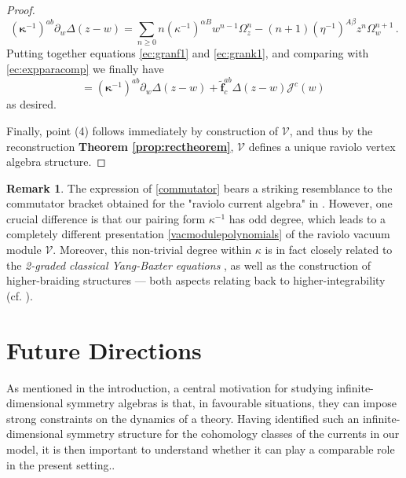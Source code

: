 \documentclass[11pt]{amsart}
\numberwithin{equation}{section}
\numberwithin{figure}{section}
\numberwithin{table}{section}
\theoremstyle{thm}
\numberwithin{equation}{subsection}
\theoremstyle{definition}
\theoremstyle{rem}
\newtheorem{remark}{Remark}
\begin{document}
\begin{proof}
\begin{equation}
\label{ec:grank1}
    (\bm{\kappa}^{-1})^{ab}\partial_w\Delta(z-w)=\sum_{n\geq 0} n(\kappa^{-1})^{\alpha B}w^{n-1}\Omega_z^n - (n+1)(\eta^{-1})^{A\beta}z^n\Omega_w^{n+1}\,.
\end{equation}
Putting together equations \eqref{ec:granf1} and \eqref{ec:grank1}, and comparing with \eqref{ec:expparacomp} we finally have 
\begin{equation}
    [\mathcal{J}^a(z),\mathcal{J}^b(w)]= (\bm{\kappa}^{-1})^{ab}\partial_w\Delta(z-w) + \mathbf{\tilde f}^{ab}_c\Delta(z-w)\mathcal{J}^c(w)\,
    \label{commutator}
\end{equation}
as desired.


\medskip

Finally, point (4) follows immediately by construction of $\mathcal{V}$, and thus by the reconstruction \textbf{Theorem \ref{prop:rectheorem}}, $\mathcal{V}$ defines a unique raviolo vertex algebra structure.


\end{proof}

\begin{remark}
    The expression of \eqref{commutator} bears a striking resemblance to the commutator bracket obtained for the "raviolo current algebra" in \cite{Garner:2023zqn}. However, one crucial difference is that our pairing form $\kappa^{-1}$ has odd degree, which leads to a completely different presentation \eqref{vacmodulepolynomials} of the raviolo vacuum module $\mathcal{V}$. Moreover, this non-trivial degree within $\kappa$ is in fact closely related to the \textit{2-graded classical Yang-Baxter equations} \cite{Bai_2013,chen:2022,Cirio:2012be}, as well as the construction of higher-braiding structures \cite{Chen:2023tjf,Kemp_2025} --- both aspects relating back to higher-integrability (cf. \cite{Chen:2023integrable}).
\end{remark}


\medskip




\section*{Future Directions}


As mentioned in the introduction, a central motivation for studying infinite-dimensional symmetry algebras is that, in favourable situations, they can impose strong constraints on the dynamics of a theory. Having identified such an infinite-dimensional symmetry structure for the cohomology classes of the currents in our model, it is then important to understand whether it can play a comparable role in the present setting..
\end{document}
